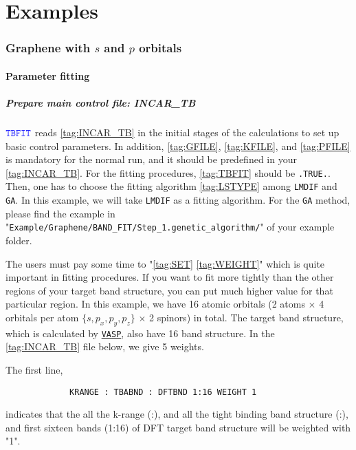 \documentclass[a4paper,12pt]{scrartcl}
\newcommand{\tbfitname}{\textcolor{blue!85!white}{\texttt{TBFIT}}}
\begin{document}
\newpage
\part{Examples}
\setcounter{section}{0}

\section{Graphene with $s$ and $p$ orbitals}
	\subsection{Parameter fitting}
		\subsubsection{Prepare main control file: INCAR\_TB}
		$\tbfitname$ reads \ref{tag:INCAR_TB} in the initial stages of the calculations to set up basic control parameters. In addition, \ref{tag:GFILE}, \ref{tag:KFILE}, and \ref{tag:PFILE} is mandatory for the normal run, and it should be predefined in your \ref{tag:INCAR_TB}.
		For the fitting procedures, \ref{tag:TBFIT} should be \texttt{.TRUE.}. Then, one has to choose the fitting algorithm \ref{tag:LSTYPE} among \texttt{LMDIF} and \texttt{GA}. In this example, we will take \texttt{LMDIF} as a fitting algorithm. For the \texttt{GA} method, please find the example in "\texttt{Example/Graphene/BAND\_FIT/Step\_1.genetic\_algorithm/}" of your example folder.
		 
	
		The users must pay some time to "\ref{tag:SET} \ref{tag:WEIGHT}" which is quite important in fitting procedures. If you want to fit more tightly than the other regions of your target band structure, you can put much higher value for that particular region. In this example, we have  16 atomic orbitals (2 atoms $\times$ 4 orbitals per atom $\{s, p_x, p_y, p_z\}$ $\times$ 2 spinors) in total. The target band structure, which is calculated by \href{https://www.vasp.at}{\texttt{VASP}}, also have 16 band structure. In the \ref{tag:INCAR_TB} file below, we give 5 weights. 
		
			The first line,
		    \begin{Verbatim}
             KRANGE : TBABND : DFTBND 1:16 WEIGHT 1
		    \end{Verbatim}
			indicates that the all the k-range (:), and all the tight binding band structure (:), and first sixteen bands (1:16) of DFT target band structure will be weighted with "1".
\end{document}
